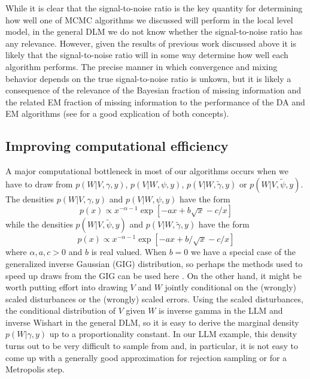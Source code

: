 \documentclass{article}
\begin{document}
While it is clear that the signal-to-noise ratio is the key quantity for determining how well one of MCMC algorithms we discussed will perform in the local level model, in the general DLM we do not know whether the signal-to-noise ratio has any relevance. However, given the results of previous work discussed above it is likely that the signal-to-noise ratio will in some way determine how well each algorithm performs. The precise manner in which convergence and mixing behavior depends on the true signal-to-noise ratio is unkown, but it is likely a consequence of the relevance of the Bayesian fraction of missing information and the related EM fraction of missing information to the performance of the DA and EM algorithms (see  for a good explication of both concepts).


\subsection{Improving computational efficiency}

A major computational bottleneck in most of our algorithms occurs when we have to draw from $p(W|V,\gamma,y)$, $p(V|W,\psi,y)$, $p(V|W,\tilde{\gamma},y)$ or $p(W|V,\tilde{\psi},y)$. The densities $p(W|V,\gamma,y)$ and $p(V|W,\psi,y)$ have the form
\[
p(x)\propto x^{-\alpha-1}\exp\left[-ax + b\sqrt{x} - c/x\right]
\]
while the densities $p(W|V,\tilde{\psi},y)$ and $p(V|W,\tilde{\gamma},y)$ have the form
\[
p(x)\propto x^{-\alpha-1}\exp\left[ -ax + b/\sqrt{x} -c/x\right]
\]
where $\alpha,a,c>0$ and $b$ is real valued. When $b=0$ we have a special case of the generalized inverse Gaussian (GIG) distribution, so perhaps the methods used to speed up draws from the GIG can be used here \cite{jorgensen1982statistical,dagpunar1989easily,devroye2012random}. On the other hand, it might be worth putting effort into drawing $V$ and $W$ jointly conditional on the (wrongly) scaled disturbances or the (wrongly) scaled errors. Using the scaled disturbances, the conditional distribution of $V$ given $W$ is inverse gamma in the LLM and inverse Wishart in the general DLM, so it is easy to derive the marginal density $p(W|\gamma,y)$ up to a proportionality constant. In our LLM example, this density turns out to be very difficult to sample from and, in particular, it is not easy to come up with a generally good approximation for rejection sampling or for a Metropolis step. 
\end{document}
